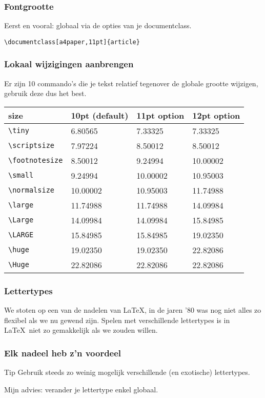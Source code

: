 \begin{frame}[fragile]
  \frametitle{Fontgrootte}

  Eerst en vooral: globaal via de opties van je documentclass.
\begin{verbatim}
\documentclass[a4paper,11pt]{article}
\end{verbatim}
\end{frame}

\begin{frame}[fragile]
  \frametitle{Lokaal wijzigingen aanbrengen}

  Er zijn 10 commando's die je tekst relatief tegenover de globale grootte wijzigen, gebruik deze dus het best.
\end{frame}

\begin{frame}[fragile]
\begin{tabular}{llll}
  \toprule
  size & 10pt (default) & 11pt option & 12pt option \\\midrule
  \verb|\tiny| &	6.80565 &	7.33325 &	7.33325 \\
  \verb|\scriptsize|& 	7.97224 &	8.50012& 	8.50012  \\
  \verb|\footnotesize|& 	8.50012 &	9.24994 &	10.00002 \\
  \verb|\small| 	&9.24994 &	10.00002 &	10.95003         \\
  \verb|\normalsize|& 	10.00002 &	10.95003 &	11.74988 \\
  \verb|\large| 	&11.74988 &	11.74988 &	14.09984         \\
  \verb|\Large| 	&14.09984 &	14.09984 &	15.84985         \\
  \verb|\LARGE| 	&15.84985 &	15.84985 &	19.02350         \\
  \verb|\huge| 	&19.02350 &	19.02350 &	22.82086         \\
  \verb|\Huge| 	&22.82086 &	22.82086 &	22.82086        \\
  \bottomrule
  \end{tabular}
\end{frame}

\begin{frame}
  \frametitle{Lettertypes}

  We stoten op een van de nadelen van \LaTeX, in de jaren '80 was nog niet alles zo flexibel als we nu gewend zijn. Spelen met verschillende lettertypes is in \LaTeX~niet zo gemakkelijk als we zouden willen.
\end{frame}

\begin{frame}
  \frametitle{Elk nadeel heb z'n voordeel}

  \begin{exampleblock}{Tip}
	Gebruik steeds zo weinig mogelijk verschillende (en exotische) lettertypes.
  \end{exampleblock}

  Mijn advies: verander je lettertype enkel globaal.
\end{frame}

